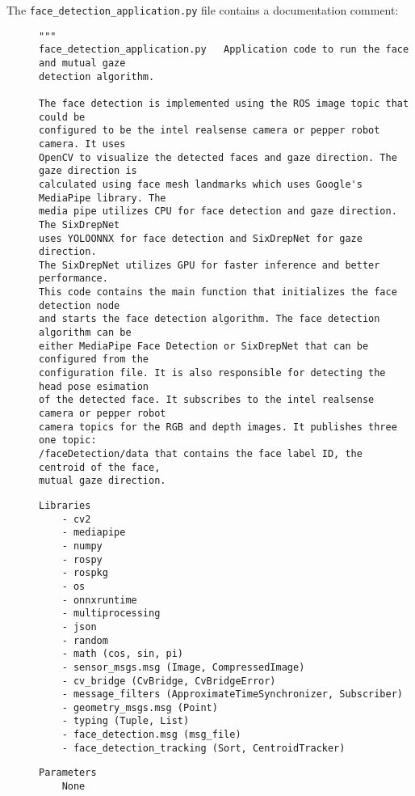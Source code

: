 \documentclass{CSSRforAfrica}
\newcommand{\checkboxChecked}{\fbox{\ding{51}}} %
\begin{document}
\noindent The {\small \verb+face_detection_application.py+} file contains a documentation comment:

\begin{description}

\item[\checkboxChecked] 
 {\small 
\begin{verbatim}
"""
face_detection_application.py   Application code to run the face and mutual gaze 
detection algorithm.

The face detection is implemented using the ROS image topic that could be 
configured to be the intel realsense camera or pepper robot camera. It uses 
OpenCV to visualize the detected faces and gaze direction. The gaze direction is 
calculated using face mesh landmarks which uses Google's MediaPipe library. The 
media pipe utilizes CPU for face detection and gaze direction. The SixDrepNet 
uses YOLOONNX for face detection and SixDrepNet for gaze direction. 
The SixDrepNet utilizes GPU for faster inference and better performance. 
This code contains the main function that initializes the face detection node 
and starts the face detection algorithm. The face detection algorithm can be 
either MediaPipe Face Detection or SixDrepNet that can be configured from the 
configuration file. It is also responsible for detecting the head pose esimation 
of the detected face. It subscribes to the intel realsense camera or pepper robot 
camera topics for the RGB and depth images. It publishes three one topic: 
/faceDetection/data that contains the face label ID, the centroid of the face, 
mutual gaze direction. 
\end{verbatim}}

\newpage
\item[\checkboxChecked] 
 {\small 
\begin{verbatim}
Libraries
    - cv2
    - mediapipe
    - numpy
    - rospy
    - rospkg
    - os
    - onnxruntime
    - multiprocessing
    - json
    - random
    - math (cos, sin, pi)
    - sensor_msgs.msg (Image, CompressedImage)
    - cv_bridge (CvBridge, CvBridgeError)
    - message_filters (ApproximateTimeSynchronizer, Subscriber)
    - geometry_msgs.msg (Point)
    - typing (Tuple, List)
    - face_detection.msg (msg_file)
    - face_detection_tracking (Sort, CentroidTracker)
\end{verbatim}}

\item[\checkboxChecked] 
 {\small 
\begin{verbatim}
Parameters 
    None
\end{verbatim}}



\end{description}
\end{document}
